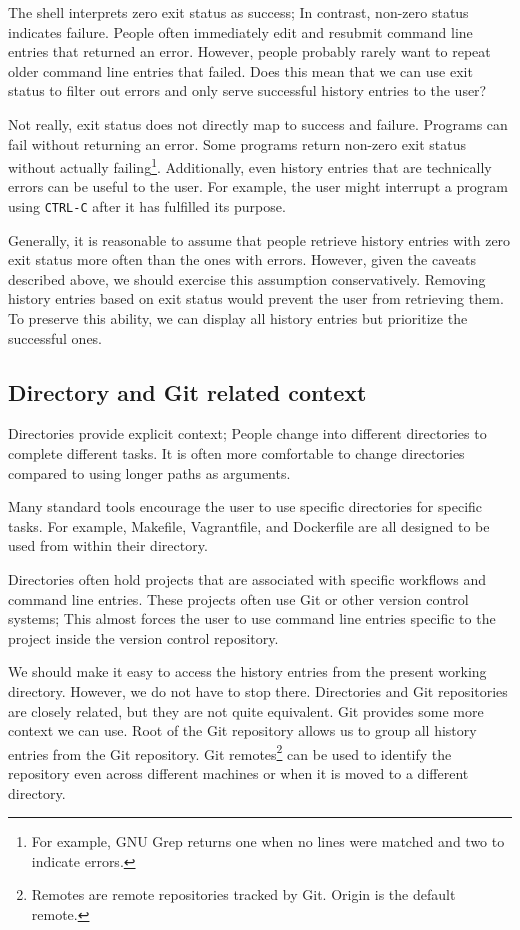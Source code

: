 The shell interprets zero exit status as success; In contrast, non-zero status indicates failure.\cite{bashman} People often immediately edit and resubmit command line entries that returned an error. However, people probably rarely want to repeat older command line entries that failed. Does this mean that we can use exit status to filter out errors and only serve successful history entries to the user?

Not really, exit status does not directly map to success and failure. Programs can fail without returning an error. Some programs return non-zero exit status without actually failing\footnote{For example, GNU Grep returns one when no lines were matched and two to indicate errors.\cite{man-grep}}. 
Additionally, even history entries that are technically errors can be useful to the user. For example, the user might interrupt a program using \verb|CTRL-C| after it has fulfilled its purpose.

Generally, it is reasonable to assume that people retrieve history entries with zero exit status more often than the ones with errors. However, given the caveats described above, we should exercise this assumption conservatively. Removing history entries based on exit status would prevent the user from retrieving them. To preserve this ability, we can display all history entries but prioritize the successful ones.

\subsection{Directory and Git related context}

Directories provide explicit context; People change into different directories to complete different tasks.\cite{greenberg1993computer} It is often more comfortable to change directories compared to using longer paths as arguments. 

Many standard tools encourage the user to use specific directories for specific tasks. 
For example, Makefile, Vagrantfile, and Dockerfile are all designed to be used from within their directory\cite{man-make}\cite{docs-vagrantfile}\cite{docs-dockerfile}. 

Directories often hold projects that are associated with specific workflows and command line entries. 
These projects often use Git or other version control systems; This almost forces the user to use command line entries specific to the project inside the version control repository. 

We should make it easy to access the history entries from the present working directory.
However, we do not have to stop there. Directories and Git repositories are closely related, but they are not quite equivalent. Git provides some more context we can use. 
Root of the Git repository allows us to group all history entries from the Git repository.
Git remotes\footnote{Remotes are remote repositories tracked by Git. Origin is the default remote.} can be used to identify the repository even across different machines or when it is moved to a different directory. 




